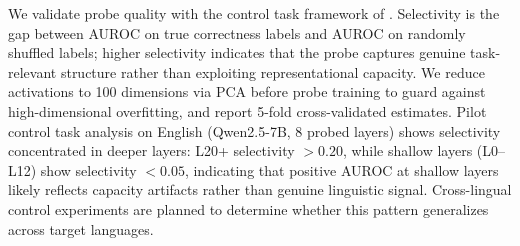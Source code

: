 We validate probe quality with the control task framework of \citet{hewitt2019control}.
Selectivity is the gap between AUROC on true correctness labels and AUROC on randomly shuffled labels; higher selectivity indicates that the probe captures genuine task-relevant structure rather than exploiting representational capacity. We reduce activations to 100 dimensions via PCA before probe training to guard against high-dimensional overfitting, and report 5-fold cross-validated estimates. Pilot control task analysis on English (Qwen2.5-7B, 8 probed layers) shows selectivity concentrated in deeper layers: L20+ selectivity $> 0.20$, while shallow layers (L0--L12) show selectivity $< 0.05$, indicating that positive AUROC at shallow layers likely reflects capacity artifacts rather than genuine linguistic signal. Cross-lingual control experiments are planned to determine whether this pattern generalizes across target languages.
